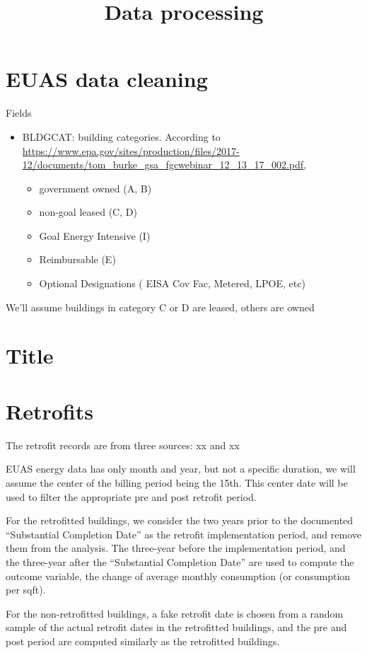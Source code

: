 \documentclass[12pt]{article}
\begin{document}
\title{Data processing}
\maketitle
\tableofcontents
\newpage
\section{EUAS data cleaning}

Fields
\begin{itemize}
\item BLDGCAT: building categories. According to
  \url{https://www.epa.gov/sites/production/files/2017-12/documents/tom_burke_gsa_fgcwebinar_12_13_17_002.pdf},
  \begin{itemize}
  \item government owned (A, B)
  \item non-goal leased (C, D)
  \item Goal Energy Intensive (I)
  \item Reimbursable (E)
  \item Optional Designations ( EISA Cov Fac, Metered, LPOE, etc)
  \end{itemize}
\end{itemize}

We'll assume buildings in category C or D are leased, others are owned
\section{Title}

\section{Retrofits}
The retrofit records are from three sources: xx and xx

EUAS energy data has only month and year, but not a specific duration, we will
assume the center of the billing period being the 15th. This center date will be
used to filter the appropriate pre and post retrofit period.

For the retrofitted buildings, we consider the two years prior to the
documented ``Substantial Completion Date'' as the retrofit implementation
period, and remove them from the analysis. The three-year before the
implementation period, and the three-year after the ``Substantial Completion
Date'' are used to compute the outcome variable, the change of average monthly
consumption (or consumption per sqft).

For the non-retrofitted buildings, a fake retrofit date is chosen from a random
sample of the actual retrofit dates in the retrofitted buildings, and the pre
and post period are computed similarly as the retrofitted buildings.

\newpage

% 
\end{document}
